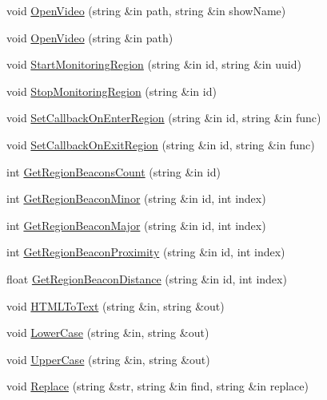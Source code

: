 \begin{DoxyCompactItemize}
\item 
void \hyperlink{class_scene_script_core_utils_a5e52a560b264f2b2ee8f6579e031459d}{Open\+Video} (string \&in path, string \&in show\+Name)
\item 
void \hyperlink{class_scene_script_core_utils_a9c84f8e58f032546cb230a655956f941}{Open\+Video} (string \&in path)
\item 
void \hyperlink{class_scene_script_core_utils_aad71200535a5088e14caee6329d8dd4b}{Start\+Monitoring\+Region} (string \&in id, string \&in uuid)
\item 
void \hyperlink{class_scene_script_core_utils_a5e7fdd32a7bec0c97f8077581058890f}{Stop\+Monitoring\+Region} (string \&in id)
\item 
void \hyperlink{class_scene_script_core_utils_a2722a33db0a0fa3a0d5d8bbf41249257}{Set\+Callback\+On\+Enter\+Region} (string \&in id, string \&in func)
\item 
void \hyperlink{class_scene_script_core_utils_a3f8274fd2e3f443468c778c727b63e77}{Set\+Callback\+On\+Exit\+Region} (string \&in id, string \&in func)
\item 
int \hyperlink{class_scene_script_core_utils_acc87a7db2e222d65eee89d9f7798d247}{Get\+Region\+Beacons\+Count} (string \&in id)
\item 
int \hyperlink{class_scene_script_core_utils_a19636799c31d3276957ccfc9e97dc648}{Get\+Region\+Beacon\+Minor} (string \&in id, int index)
\item 
int \hyperlink{class_scene_script_core_utils_ab14a3ede103acb243489482f41f5fca0}{Get\+Region\+Beacon\+Major} (string \&in id, int index)
\item 
int \hyperlink{class_scene_script_core_utils_a0ddeb1ee4d6d9dd34cca8ec28bd80e03}{Get\+Region\+Beacon\+Proximity} (string \&in id, int index)
\item 
float \hyperlink{class_scene_script_core_utils_aac5bb622b04a044a05dcd3d8b1444ff8}{Get\+Region\+Beacon\+Distance} (string \&in id, int index)
\item 
void \hyperlink{class_scene_script_core_utils_afaf74e221cef71b3f63c8db5cea18a67}{H\+T\+M\+L\+To\+Text} (string \&in, string \&out)
\item 
void \hyperlink{class_scene_script_core_utils_abf1b29c423616c51cd7ca6c654ac4971}{Lower\+Case} (string \&in, string \&out)
\item 
void \hyperlink{class_scene_script_core_utils_ab561c8dad7dd36ecb08f60c06ef021cb}{Upper\+Case} (string \&in, string \&out)
\item 
void \hyperlink{class_scene_script_core_utils_ac29aa08f8bec088a811e17c32df2ae1e}{Replace} (string \&str, string \&in find, string \&in replace)

\end{DoxyCompactItemize}
